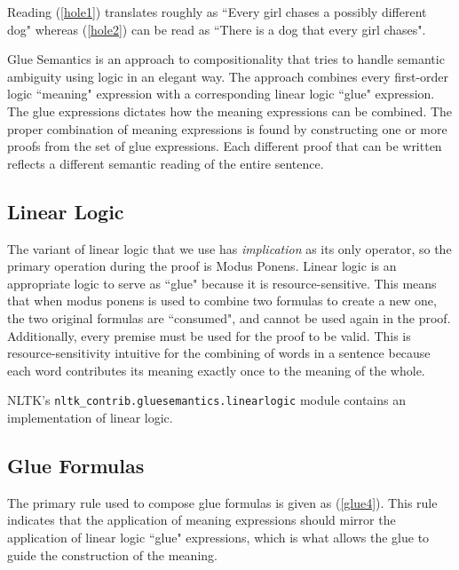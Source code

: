 \documentclass{article}
\newcommand{\dhgcode}[1]{{\tt #1}}
\begin{document}

Reading (\ref{hole1}) translates roughly as ``Every girl chases a possibly different dog" whereas (\ref{hole2}) can be read as ``There is a dog that every girl chases".  

Glue Semantics is an approach to compositionality that tries to handle semantic ambiguity using logic in an elegant way.  The approach combines every first-order logic ``meaning" expression with a corresponding linear logic ``glue" expression.  The glue expressions dictates how the meaning expressions can be combined.  The proper combination of meaning expressions is found by constructing one or more proofs from the set of glue expressions.  Each different proof that can be written reflects a different semantic reading of the entire sentence.  

\subsection{Linear Logic}
The variant of linear logic that we use has \emph{implication} as its only operator, so the primary operation during the proof is Modus Ponens.  Linear logic is an appropriate logic to serve as ``glue" because it is resource-sensitive.  This means that when modus ponens is used to combine two formulas to create a new one, the two original formulas are ``consumed", and cannot be used again in the proof.  Additionally, every premise must be used for the proof to be valid.  This is resource-sensitivity intuitive for the combining of words in a sentence because each word contributes its meaning exactly once to the meaning of the whole.


NLTK's \dhgcode{nltk\_contrib.gluesemantics.linearlogic} module contains an implementation of linear logic.

\subsection{Glue Formulas}
The primary rule used to compose glue formulas is given as (\ref{glue4}).  This rule indicates that the application of meaning expressions should mirror the application of linear logic ``glue" expressions, which is what allows the glue to guide the construction of the meaning.
\end{document}
